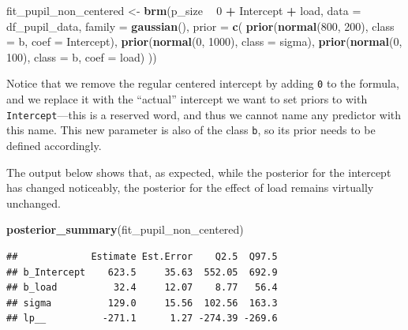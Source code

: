 \documentclass[12pt,]{krantz}
\newenvironment{Shaded}{\begin{snugshade}}{\end{snugshade}}
\newcommand{\KeywordTok}[1]{\textcolor[rgb]{0.13,0.29,0.53}{\textbf{#1}}}
\newcommand{\DataTypeTok}[1]{\textcolor[rgb]{0.13,0.29,0.53}{#1}}
\newcommand{\DecValTok}[1]{\textcolor[rgb]{0.00,0.00,0.81}{#1}}
\newcommand{\StringTok}[1]{\textcolor[rgb]{0.31,0.60,0.02}{#1}}
\newcommand{\OperatorTok}[1]{\textcolor[rgb]{0.81,0.36,0.00}{\textbf{#1}}}
\newcommand{\NormalTok}[1]{#1}
\theoremstyle{definition}
\theoremstyle{definition}
\theoremstyle{definition}
\theoremstyle{remark}
\begin{document}
\begin{Shaded}
\begin{Highlighting}[]
\NormalTok{fit_pupil_non_centered <-}\StringTok{ }\KeywordTok{brm}\NormalTok{(p_size }\OperatorTok{~}\StringTok{ }\DecValTok{0} \OperatorTok{+}\StringTok{ }\NormalTok{Intercept }\OperatorTok{+}\StringTok{ }\NormalTok{load,}
                 \DataTypeTok{data =}\NormalTok{ df_pupil_data,}
                 \DataTypeTok{family =} \KeywordTok{gaussian}\NormalTok{(),}
                 \DataTypeTok{prior =} \KeywordTok{c}\NormalTok{(}
                     \KeywordTok{prior}\NormalTok{(}\KeywordTok{normal}\NormalTok{(}\DecValTok{800}\NormalTok{, }\DecValTok{200}\NormalTok{), }\DataTypeTok{class =}\NormalTok{ b, }\DataTypeTok{coef =}\NormalTok{ Intercept),}
                     \KeywordTok{prior}\NormalTok{(}\KeywordTok{normal}\NormalTok{(}\DecValTok{0}\NormalTok{, }\DecValTok{1000}\NormalTok{), }\DataTypeTok{class =}\NormalTok{ sigma),}
                     \KeywordTok{prior}\NormalTok{(}\KeywordTok{normal}\NormalTok{(}\DecValTok{0}\NormalTok{, }\DecValTok{100}\NormalTok{), }\DataTypeTok{class =}\NormalTok{ b, }\DataTypeTok{coef =}\NormalTok{ load)}
\NormalTok{                 ))}
\end{Highlighting}
\end{Shaded}

Notice that we remove the regular centered intercept by adding
\texttt{0} to the formula, and we replace it with the ``actual''
intercept we want to set priors to with \texttt{Intercept}---this is a
reserved word, and thus we cannot name any predictor with this name.
This new parameter is also of the class \texttt{b}, so its prior needs
to be defined accordingly.

The output below shows that, as expected, while the posterior for the
intercept has changed noticeably, the posterior for the effect of load
remains virtually unchanged.

\begin{Shaded}
\begin{Highlighting}[]
\KeywordTok{posterior_summary}\NormalTok{(fit_pupil_non_centered)}
\end{Highlighting}
\end{Shaded}

\begin{verbatim}
##             Estimate Est.Error    Q2.5  Q97.5
## b_Intercept    623.5     35.63  552.05  692.9
## b_load          32.4     12.07    8.77   56.4
## sigma          129.0     15.56  102.56  163.3
## lp__          -271.1      1.27 -274.39 -269.6
\end{verbatim}
\end{document}
